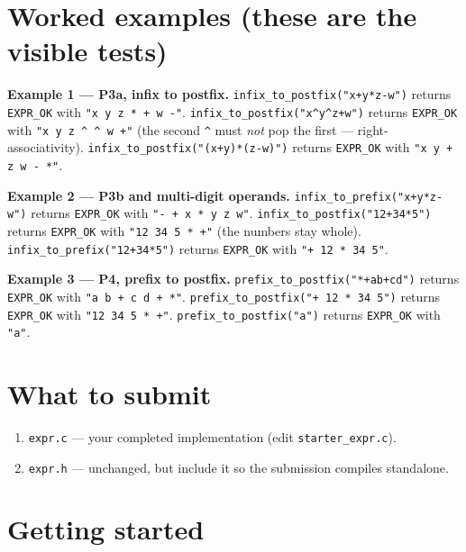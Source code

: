 \documentclass[11pt]{article}
\begin{document}
\section{Worked examples (these are the visible tests)}

\textbf{Example 1 --- P3a, infix to postfix.} \texttt{infix\_to\_postfix("x+y*z-w")} returns \texttt{EXPR\_OK} with \texttt{"x y z * + w -"}. \texttt{infix\_to\_postfix("x\^{}y\^{}z+w")} returns \texttt{EXPR\_OK} with \texttt{"x y z \^{} \^{} w +"} (the second \texttt{\^{}} must \emph{not} pop the first --- right-associativity). \texttt{infix\_to\_postfix("(x+y)*(z-w)")} returns \texttt{EXPR\_OK} with \texttt{"x y + z w - *"}.

\textbf{Example 2 --- P3b and multi-digit operands.} \texttt{infix\_to\_prefix("x+y*z-w")} returns \texttt{EXPR\_OK} with \texttt{"- + x * y z w"}. \texttt{infix\_to\_postfix("12+34*5")} returns \texttt{EXPR\_OK} with \texttt{"12 34 5 * +"} (the numbers stay whole). \texttt{infix\_to\_prefix("12+34*5")} returns \texttt{EXPR\_OK} with \texttt{"+ 12 * 34 5"}.

\textbf{Example 3 --- P4, prefix to postfix.} \texttt{prefix\_to\_postfix("*+ab+cd")} returns \texttt{EXPR\_OK} with \texttt{"a b + c d + *"}. \texttt{prefix\_to\_postfix("+ 12 * 34 5")} returns \texttt{EXPR\_OK} with \texttt{"12 34 5 * +"}. \texttt{prefix\_to\_postfix("a")} returns \texttt{EXPR\_OK} with \texttt{"a"}.

\section{What to submit}

\begin{enumerate}
  \item \texttt{expr.c} --- your completed implementation (edit \texttt{starter\_expr.c}).
  \item \texttt{expr.h} --- unchanged, but include it so the submission compiles standalone.
\end{enumerate}

\section{Getting started}
\end{document}
